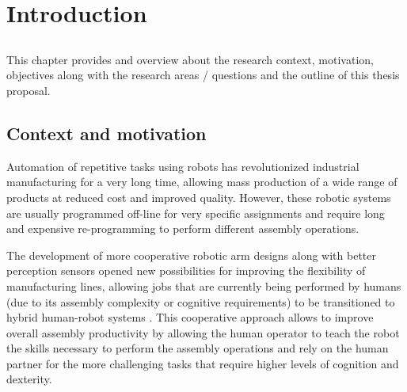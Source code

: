 \chapter{Introduction}\label{chap:introduction}



\section*{}

This chapter provides and overview about the research context, motivation, objectives along with the research areas / questions and the outline of this thesis proposal.



\section{Context and motivation}

Automation of repetitive tasks using robots has revolutionized industrial manufacturing for a very long time, allowing mass production of a wide range of products at reduced cost and improved quality. However, these robotic systems are usually programmed off-line for very specific assignments and require long and expensive re-programming to perform different assembly operations.

The development of more cooperative robotic arm designs along with better perception sensors opened new possibilities for improving the flexibility of manufacturing lines, allowing jobs that are currently being performed by humans (due to its assembly complexity or cognitive requirements) to be transitioned to hybrid human-robot systems \cite{Surdilovic2010}. This cooperative approach allows to improve overall assembly productivity by allowing the human operator to teach the robot the skills necessary to perform the assembly operations and rely on the human partner for the more challenging tasks that require higher levels of cognition and dexterity.

